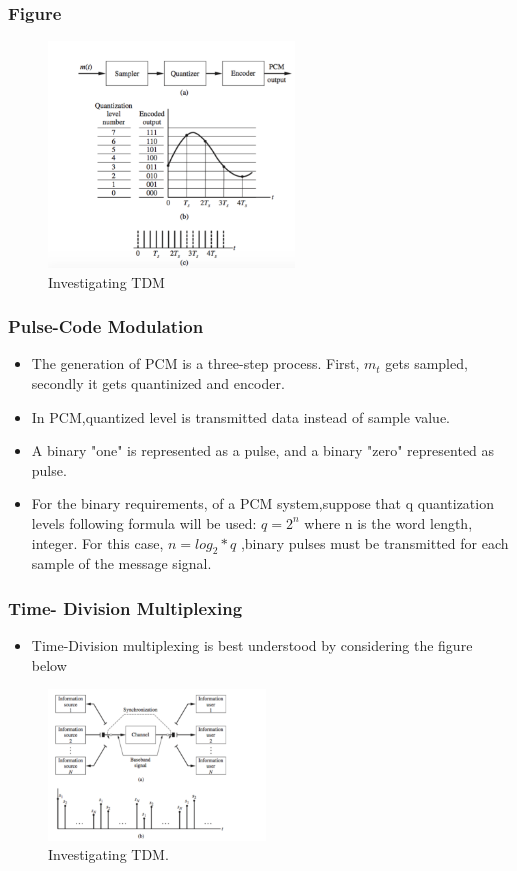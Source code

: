 \documentclass{beamer}
\begin{document}
         \begin{frame}
         \frametitle{Figure}
         \begin{figure}
\includegraphics[width=\textwidth,height= 6cm,keepaspectratio,center]{fig1-pcm.png}
  \caption{Investigating TDM}
  \label{fig:time-divison1}
\end{figure}
         
         \end{frame}
         
         \begin{frame}
         \frametitle{Pulse-Code Modulation}
         \begin{itemize}
         \item The generation of PCM is a three-step process. First, $m_t$ gets sampled, secondly it gets quantinized and encoder.
         \item In PCM,quantized level is transmitted data instead of sample value.
         \item A binary "one" is represented as a pulse, and a binary "zero" represented as pulse.
         \item For the binary requirements, of a PCM system,suppose that q 	quantization levels following formula  will be used: $q=2^n$ where n is the word length, integer. For this case, $n=log_2*q$ ,binary pulses must be transmitted for each sample of the message signal.
         \end {itemize}
         \end{frame}
         
         \begin{frame}
         \frametitle{Time- Division Multiplexing}
         \begin{itemize}
         \item Time-Division multiplexing is best understood by considering the figure below
         \end{itemize}
         \begin{figure}
\includegraphics[width=\textwidth,height= 4cm,keepaspectratio]{fig1.png}
  \caption{Investigating TDM.}
  \label{fig:time-divison1}
\end{figure}
\end{frame}
\end{document}
